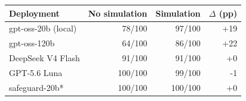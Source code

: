 \begin{tabular}{lrrr}
\toprule
Deployment & No simulation & Simulation & $\Delta$ (pp) \\
\midrule
gpt-oss-20b (local) & 78/100 & 97/100 & +19 \\
gpt-oss-120b & 64/100 & 86/100 & +22 \\
DeepSeek V4 Flash & 91/100 & 91/100 & +0 \\
GPT-5.6 Luna & 100/100 & 99/100 & -1 \\
safeguard-20b* & 100/100 & 100/100 & +0 \\
\bottomrule
\end{tabular}
